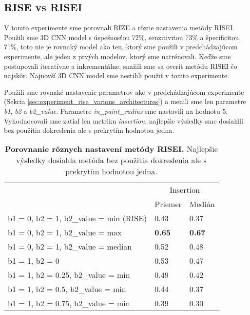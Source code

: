 \subsection{RISE vs RISEI}

V tomto experimente sme porovnali RIZE a rôzne nastavenia metódy RISEI. Použili sme 3D CNN model s úspešnosťou 72\%, senzitivitou 73\% a špecificitou 71\%, toto nie je rovnaký model ako ten, ktorý sme použili v predchádzajúcom experimente, ale jeden z prvých modelov, ktorý sme natrénovali. Keďže sme postupovali iteratívne a inkrementálne, snažili sme sa overiť metódu RISEI čo najskôr. Najnovší 3D CNN model sme nestihli použiť v tomto experimente. 

Použili sme rovnaké nastavenie parametrov ako v predchádzajúcom experimente (Sekcia \ref{sec:experiment_rise_various_architectures}) a menili sme len parametre \textit{b1}, \textit{b2} a \textit{b2\_value}. Parametre \textit{in\_paint\_radius} sme nastavili na hodnotu $5$. Vyhodnocovali sme zatiaľ len metriku \textit{insertion}, najlepšie výsledky sme dosiahlli bez použitia dokreslenia ale s prekrytím hodnotou jedna.

\begin{table}[]
    \centering
    \begin{tabular}{l|l|l|}
        \cline{2-3}
                                                                    & \multicolumn{2}{c|}{Insertion} \\ \cline{2-3} 
                                                                    & Priemer        & Medián        \\ \hline
        \multicolumn{1}{|l|}{b1 =  0, b2 = 1, b2\_value = min (RISE)} & 0.43           & 0.37          \\ \hline
        \multicolumn{1}{|l|}{b1 =  0, b2 = 1, b2\_value = max}        & \textbf{0.65}  & \textbf{0.67} \\ \hline
        \multicolumn{1}{|l|}{b1 =  0, b2 = 1, b2\_value = median}     & 0.52           & 0.48          \\ \hline
        \multicolumn{1}{|l|}{b1 =  1, b2 = 0}                        & 0.53           & 0.47          \\ \hline
        \multicolumn{1}{|l|}{b1 =  1, b2 = 0.25, b2\_value = min}     & 0.49           & 0.42          \\ \hline
        \multicolumn{1}{|l|}{b1 =  1, b2 = 0.5, b2\_value = min}      & 0.44           & 0.37          \\ \hline
        \multicolumn{1}{|l|}{b1 =  1, b2 = 0.75, b2\_value = min}     & 0.39           & 0.30          \\ \hline
    \end{tabular}
    \caption{\textbf{Porovnanie rôznych nastavení metódy RISEI.} Najlepšie výsledky dosiahla metóda bez použitia dokreslenia ale s prekrytím hodnotou jedna.}
    \label{tab:experiment_risei_various_configuration}
\end{table}

